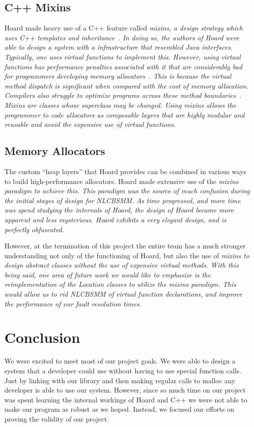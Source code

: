 \documentclass[9pt]{sig-alternate-10pt}
\begin{document}
\subsection{C++ Mixins}
\label{mixins}
Hoard made heavy use of a C++ feature called \em mixins\em, a design strategy which uses C++ templates and inheritance~\cite{heaplayers}.  In doing so, the authors of Hoard were able to design a system with a infrastructure that resembled Java interfaces.  Typically, one uses \em virtual \em functions to implement this.  However, using \em virtual \em functions has performance penalties associated with it that are considerably bad for programmers developing memory allocators~\cite{heaplayers}.  This is because the \em virtual \em method dispatch is significant when compared with the cost of memory allocation.  Compilers also struggle to optimize programs across these \em method boundaries\em~\cite{heaplayers}.  Mixins are classes whose superclass may be changed.  Using mixins allows the programmer to code allocators as composable layers that are highly modular and reusable and avoid the expensive use of \em virtual \em functions.

\subsection{Memory Allocators}
The custom ``heap layers'' that Hoard provides can be combined in various ways to build high-performance allocators.  Hoard made extensive use of the \em mixins \em paradigm to achieve this.  This paradigm was the source of much confusion during the initial stages of design for NLCBSMM.  As time progressed, and more time was spend studying the internals of Hoard, the design of Hoard became more apparent and less mysterious.  Hoard exhibits a very elegant design, and is perfectly obfuscated.

However, at the termination of this project the entire team has a much stronger understanding not only of the functioning of Hoard, but also the use of \em mixins \em to design abstract classes without the use of expensive \em virtual \em methods.  With this being said, one area of future work we would like to emphasize is the reimplementation of the Location classes to utilize the \em mixins \em paradigm.  This would allow us to rid NLCBSMM of \em virtual \em function declarations, and improve the performance of our fault resolution times.

\section{Conclusion}
\label {conclusion}
We were excited to meet most of our project goals. We were able to design a system that a developer could use without having to use special function calls. Just by linking with our library and then making regular calls to malloc any developer is able to use our system. However, since so much time on our project was spent learning the internal workings of Hoard and C++ we were not able to make our program as robust as we hoped. Instead, we focused our efforts on proving the validity of our project.
\end{document}
